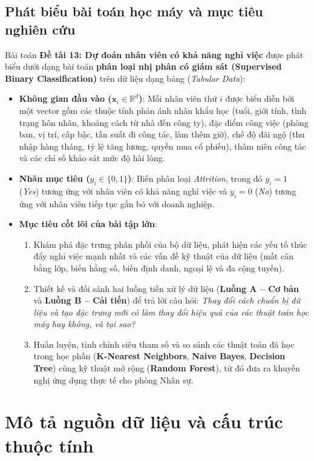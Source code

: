 \subsection{Phát biểu bài toán học máy và mục tiêu nghiên cứu}
Bài toán \textbf{Đề tài 13: Dự đoán nhân viên có khả năng nghỉ việc} được phát biểu dưới dạng bài toán \textbf{phân loại nhị phân có giám sát (Supervised Binary Classification)} trên dữ liệu dạng bảng (\textit{Tabular Data}):
\begin{itemize}
    \item \textbf{Không gian đầu vào ($\mathbf{x}_i \in \mathbb{R}^d$)}: Mỗi nhân viên thứ $i$ được biểu diễn bởi một vector gồm các thuộc tính phản ánh nhân khẩu học (tuổi, giới tính, tình trạng hôn nhân, khoảng cách từ nhà đến công ty), đặc điểm công việc (phòng ban, vị trí, cấp bậc, tần suất đi công tác, làm thêm giờ), chế độ đãi ngộ (thu nhập hàng tháng, tỷ lệ tăng lương, quyền mua cổ phiếu), thâm niên công tác và các chỉ số khảo sát mức độ hài lòng.
    \item \textbf{Nhãn mục tiêu ($y_i \in \{0, 1\}$)}: Biến phân loại \textit{Attrition}, trong đó $y_i = 1$ (\textit{Yes}) tương ứng với nhân viên có khả năng nghỉ việc và $y_i = 0$ (\textit{No}) tương ứng với nhân viên tiếp tục gắn bó với doanh nghiệp.
    \item \textbf{Mục tiêu cốt lõi của bài tập lớn}:
    \begin{enumerate}
        \item Khám phá đặc trưng phân phối của bộ dữ liệu, phát hiện các yếu tố thúc đẩy nghỉ việc mạnh nhất và các vấn đề kỹ thuật của dữ liệu (mất cân bằng lớp, biến hằng số, biến định danh, ngoại lệ và đa cộng tuyến).
        \item Thiết kế và đối sánh hai luồng tiền xử lý dữ liệu (\textbf{Luồng A -- Cơ bản} và \textbf{Luồng B -- Cải tiến}) để trả lời câu hỏi: \textit{Thay đổi cách chuẩn bị dữ liệu và tạo đặc trưng mới có làm thay đổi hiệu quả của các thuật toán học máy hay không, và tại sao?}
        \item Huấn luyện, tinh chỉnh siêu tham số và so sánh các thuật toán đã học trong học phần (\textbf{K-Nearest Neighbors}, \textbf{Naive Bayes}, \textbf{Decision Tree}) cùng kỹ thuật mở rộng (\textbf{Random Forest}), từ đó đưa ra khuyến nghị ứng dụng thực tế cho phòng Nhân sự.
    \end{enumerate}
\end{itemize}

\section{Mô tả nguồn dữ liệu và cấu trúc thuộc tính}

